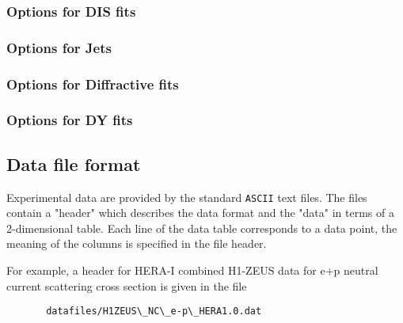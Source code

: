 \documentclass[11pt,a4paper]{article}
\begin{document}
\subsubsection{Options for DIS fits}
\subsubsection{Options for Jets}
\subsubsection{Options for Diffractive fits}
\subsubsection{Options for DY fits}
\subsection{Data file format}
\label{sec:dataformat}
   Experimental data are provided by the standard {\tt ASCII} text files. The files
   contain a "header" which describes the data format and the "data" in terms
   of a 2-dimensional table. Each line of the data table corresponds to a
   data point, the meaning of the columns is specified in the file header.

   For example, a header for HERA-I combined H1-ZEUS data for e+p neutral 
   current scattering cross section is given in the file

\begin{verbatim}
       datafiles/H1ZEUS\_NC\_e-p\_HERA1.0.dat
\end{verbatim}
\end{document}
